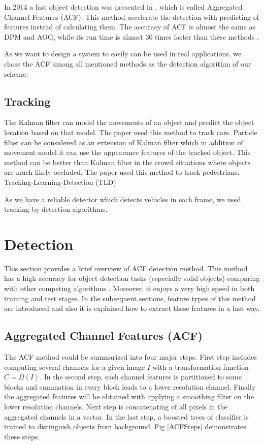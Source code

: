 \documentclass[conference]{IEEEtran}
\begin{document}
In 2014 a fast object detection was presented in \cite{dollar2014fast}, which is called Aggregated Channel Features (ACF). This method accelerate the detection with predicting of features instead of calculating them. The accuracy of ACF is almost the same as DPM and AOG, while its run time is almost 30 times faster than these methods \cite{dollar2014fast}. 

As we want to design a system to easily can be used in real applications, we chose the ACF among all mentioned methods as the detection algorithm of our scheme.

\subsection{Tracking}

The Kalman filter can model the movements of an object and predict the object location based on that model. The paper \cite{zhang2013method} used this method to track cars. Particle filter can be considered as an extension of Kalman filter which in addition of movement model it can use the appearance features of the tracked object. This method can be better than Kalman filter in the crowd situations  where objects are much likely occluded. The paper \cite{} used this method to track pedestrians. Tracking-Learning-Detection (TLD) \cite{kalal2012tracking}  

As we have a reliable  detector which detects vehicles in each frame, we used tracking by detection algorithms. 


\section{Detection}
This section provides a brief overview of ACF detection \cite{dollar2014fast} method. This method has a high accuracy for object detection tasks (especially solid objects) comparing with other competing algorithms \cite{dollar2010fastest}. Moreover, it enjoys a very high speed in both training and test stages. In the subsequent sections, feature types of this method are introduced and also it is explained how to extract these features in a fast way.

\subsection{Aggregated Channel Features (ACF)}
The ACF method could be summarized into four major steps.
First step includes computing several channels for a given image $I$ with a transformation function $C=\Omega({I})$. In the second step, each channel features is partitioned to some blocks and summation in every block leads to a lower resolution channel. Finally the aggregated features will be obtained with applying a smoothing filter on the lower resolution channels. Next step is concatenating of all pixels in the aggregated channels in a vector. In the last step, a boosted trees of classifier is trained to distinguish objects from background. Fig \ref{ACFSteps} demonstrates these steps. 
\end{document}

